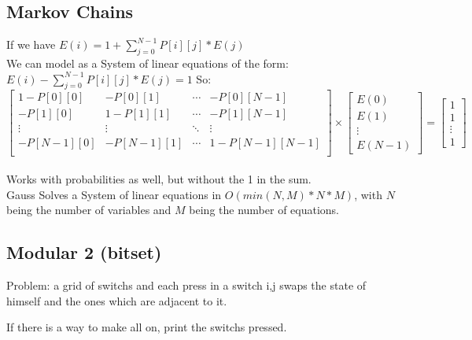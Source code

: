         \subsection{Markov Chains}
        \tab If we have $E(i) = 1 + \sum_{j=0}^{N-1} P[i][j] * E(j)$ \\
        We can model as a System of linear equations of the form: \\
        $E(i) - \sum_{j=0}^{N-1} P[i][j] * E(j) = 1$
        So: \\
        \[ \begin{bmatrix}
            1-P[0][0] & -P[0][1] & \cdots & -P[0][N-1]\\
            -P[1][0] & 1-P[1][1] & \cdots & -P[1][N-1]\\
            \vdots & \vdots & \ddots & \vdots\\ 
            -P[N-1][0] & -P[N-1][1] & \cdots & 1-P[N-1][N-1]\\
        \end{bmatrix}
        \times
        \begin{bmatrix}
            E(0)\\
            E(1)\\ 
            \vdots\\ 
            E(N-1) 
        \end{bmatrix}
        =
        \begin{bmatrix}
            1\\
            1\\ 
            \vdots\\ 
            1 
        \end{bmatrix} \] \\
        Works with probabilities as well, but without the 1 in the sum. \\
        Gauss Solves a System of linear equations in $O(min(N,M)*N*M)$, with $N$ being the number of variables and $M$ being the number of equations. \\
        

        \subsection{Modular 2 (bitset)}
        \tab Problem: a grid of switchs and each press in a switch i,j swaps the state of himself and the ones which are adjacent to it.
        
        If there is a way to make all on, print the switchs pressed.
        
        
